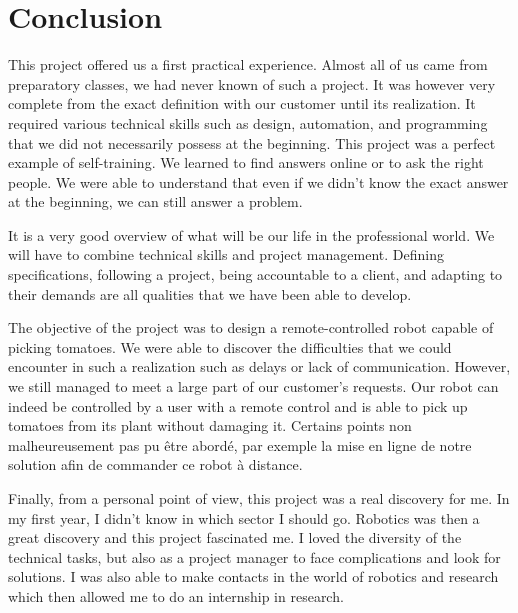 \section*{Conclusion}
\setcounter{figure}{0}

This project offered us a first practical experience. Almost all of us came from preparatory classes, we had never known of such a project. It was however very complete from the exact definition with our customer until its realization. It required various technical skills such as design, automation, and programming that we did not necessarily possess at the beginning. This project was a perfect example of self-training. We learned to find answers online or to ask the right people. We were able to understand that even if we didn't know the exact answer at the beginning, we can still answer a problem.

\bigbreak
It is a very good overview of what will be our life in the professional world. We will have to combine technical skills and project management. Defining specifications, following a project, being accountable to a client, and adapting to their demands are all qualities that we have been able to develop. 

\bigbreak
The objective of the project was to design a remote-controlled robot capable of picking tomatoes. We were able to discover the difficulties that we could encounter in such a realization such as delays or lack of communication. However, we still managed to meet a large part of our customer's requests. Our robot can indeed be controlled by a user with a remote control and is able to pick up tomatoes from its plant without damaging it. Certains points non malheureusement pas pu être abordé, par exemple la mise en ligne de notre solution afin de commander ce robot à distance.

\bigbreak
Finally, from a personal point of view, this project was a real discovery for me. In my first year, I didn't know in which sector I should go. Robotics was then a great discovery and this project fascinated me. I loved the diversity of the technical tasks, but also as a project manager to face complications and look for solutions. I was also able to make contacts in the world of robotics and research which then allowed me to do an internship in research.